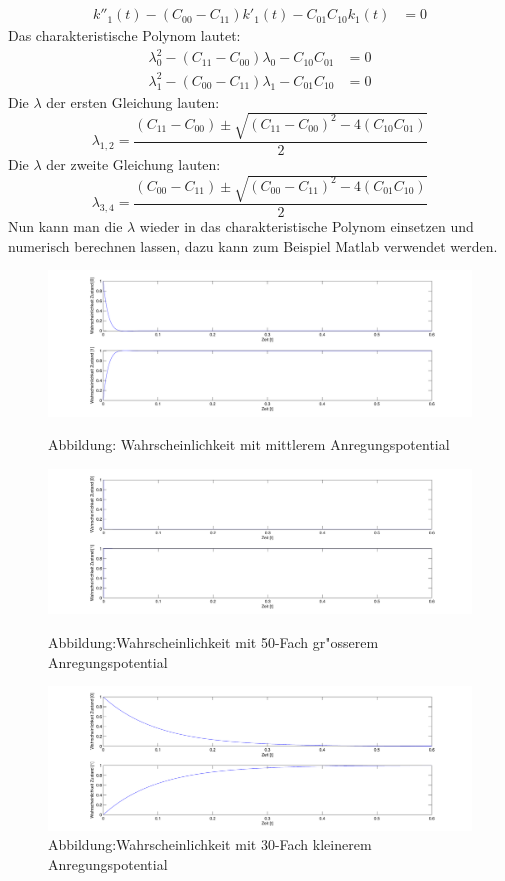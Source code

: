 \begin{refsection}
\begin{align*}
\\
k''_{1}(t) - (C_{00}-C_{11}) k'_{1}(t) - C_{01}C_{10}k_1(t)&= 0
\end{align*}
Das charakteristische Polynom lautet:
\begin{align*}
\lambda_{0}^{2} - (C_{11}-C_{00})\lambda_{0} - C_{10}C_{01}&= 0
\\
\lambda_{1}^{2} - (C_{00}-C_{11})\lambda_{1} - C_{01}C_{10}&= 0
\end{align*}
Die $ \lambda $ der ersten Gleichung lauten:
\[
\lambda_{1,2} = \frac{(C_{11}-C_{00})\pm \sqrt{(C_{11}-C_{00})^2-4(C_{10}C_{01})}}{2}
\]
Die $ \lambda $ der zweite Gleichung lauten:
\[
\lambda_{3,4} = \frac{(C_{00}-C_{11})\pm \sqrt{(C_{00}-C_{11})^2-4(C_{01}C_{10})}}{2}
\]
Nun kann man die $\lambda$ wieder in das charakteristische Polynom
einsetzen und numerisch berechnen lassen, dazu kann zum Beispiel Matlab
verwendet werden.

\begin{figure}
\centering
\includegraphics[width=1\textwidth]{flash/graphics/potentialmittel.pdf}
\caption{Abbildung: Wahrscheinlichkeit mit mittlerem Anregungspotential
\label{skript:potentialmittel}}
%
\centering
\includegraphics[width=1\textwidth]{flash/graphics/potentialgross.pdf}
\caption{Abbildung:Wahrscheinlichkeit mit 50-Fach gr"osserem Anregungspotential
\label{skript:potentialgross}}
%
\centering
\includegraphics[width=1\textwidth]{flash/graphics/potentialklein.pdf}
\caption{Abbildung:Wahrscheinlichkeit mit 30-Fach kleinerem Anregungspotential
\label{skript:potentialklein}}
\end{figure}


\end{refsection}

